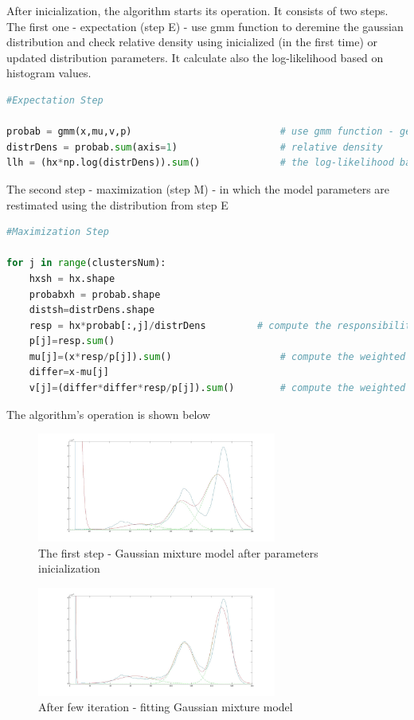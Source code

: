After inicialization, the algorithm starts its operation. It consists of two steps. The first one - expectation (step E) - use gmm function to deremine the gaussian distribution and check relative density using inicialized (in the first time) or updated distribution parameters. It calculate also the log-likelihood based on histogram values. 

\begin{lstlisting}[language=Python, caption = Segmentation - step E]
#Expectation Step

probab = gmm(x,mu,v,p)							# use gmm function - get probability
distrDens = probab.sum(axis=1)					# relative density 
llh = (hx*np.log(distrDens)).sum()				# the log-likelihood base on histogram data
\end{lstlisting}
The second step - maximization (step M) -  in which the model parameters are restimated using the distribution from step E

\begin{lstlisting}[language=Python, caption = Segmentation - step M]
#Maximization Step

for j in range(clustersNum):
    hxsh = hx.shape
    probabxh = probab.shape
    distsh=distrDens.shape
    resp = hx*probab[:,j]/distrDens			# compute the responsibilities
    p[j]=resp.sum()
    mu[j]=(x*resp/p[j]).sum()					# compute the weighted of expected values
    differ=x-mu[j]
    v[j]=(differ*differ*resp/p[j]).sum()		# compute the weighted varainces	
\end{lstlisting}

The algorithm's operation is shown below 

\begin{figure}[H]
	\centering{}\includegraphics[width=0.7\textwidth]{figures/Module_09/m09_13}
	\caption{The first step - Gaussian mixture model after parameters inicialization
	\label{fig:figures/m09_13}}
\end{figure} 

\begin{figure}[H]
	\centering{}\includegraphics[width=0.7\textwidth]{figures/Module_09/m09_14}
	\caption{After few iteration - fitting Gaussian mixture model
	\label{fig:figures/m09_14}}
\end{figure} 

